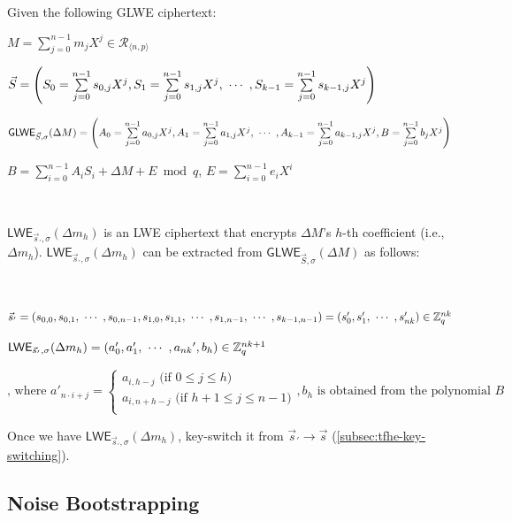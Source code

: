 \begin{tcolorbox}[title={\textbf{\tboxlabel{\ref*{subsec:tfhe-extraction}} GLWE Ciphertext's Coefficient Extraction}}]
Given the following GLWE ciphertext: 

$M = \sum\limits_{j=0}^{n-1}m_jX^j \in \mathcal{R}_{\langle n, p \rangle}$

$\vec{S} = \left(S_0 = \sum\limits_{j=0}^{n-1}s_{0,j}X^j, S_1 = \sum\limits_{j=0}^{n-1}s_{1,j}X^j, \text{ } \text{$\cdots$} \text{ }, S_{k-1} = \sum\limits_{j=0}^{n-1}s_{k-1,j}X^j \right)$

$\textsf{GLWE}_{\vec{S}, \sigma}(\Delta M) = \left(A_0 = \sum\limits_{j=0}^{n-1}a_{0,j}X^j, A_1 = \sum\limits_{j=0}^{n-1}a_{1,j}X^j, \text{ } \text{$\cdots$} \text{ }, A_{k-1} = \sum\limits_{j=0}^{n-1}a_{k-1,j}X^j, B = \sum\limits_{j=0}^{n-1}b_{j}X^j\right)$

$B = \sum\limits_{i=0}^{n-1}A_iS_i + \Delta M + E \bmod q$, \text{ } $E = \sum\limits_{i=0}^{n-1}e_iX^i$

$ $

$\textsf{LWE}_{\vec{s}_{'}, \sigma}(\Delta m_h)$ is an LWE ciphertext that encrypts $\Delta M$'s $h$-th coefficient (i.e., $\Delta m_h$). $\textsf{LWE}_{\vec{s}_{'}, \sigma}(\Delta m_h)$ can be extracted from $\textsf{GLWE}_{\vec{S}, \sigma}(\Delta M)$ as follows: 

$ $

$\vec{s}_{'} = (s_{0,0}, s_{0,1}, \text{ } \text{$\cdots$} \text{ }, s_{0,n-1}, s_{1,0}, s_{1,1}, \text{ } \text{$\cdots$} \text{ }, s_{1, n-1}, \text{ } \text{$\cdots$} \text{ }, s_{k-1, n-1}) = (s'_0, s'_1, \text{ } \text{$\cdots$} \text{ }, s'_{nk} ) \in \mathbb{Z}_q^{nk}$

$\textsf{LWE}_{\vec{s}_{'}, \sigma}(\Delta m_h) = (a_0', a_1', \text{ } \text{$\cdots$} \text{ } , a_{nk}{'}, b_h) \in \mathbb{Z}_q^{nk + 1}$


\[
    \text{, where } a'_{n \cdot i + j} =   
\begin{cases}
    a_{i,h - j} \text{ (if } 0 \leq j \leq h\text{)}\\
    a_{i,n + h - j} \text{ (if } h+1 \leq j \leq n-1\text{)}\\
\end{cases}
, b_h \text{ is obtained from the polynomial } B
\]

Once we have $\textsf{LWE}_{\vec{s}_{'}, \sigma}(\Delta m_h)$, key-switch it from $\vec{s}_{'} \rightarrow \vec{s}$ (\autoref{subsec:tfhe-key-switching}).

\end{tcolorbox}



\subsection{Noise Bootstrapping}
\label{subsec:tfhe-noise-bootstrapping}


